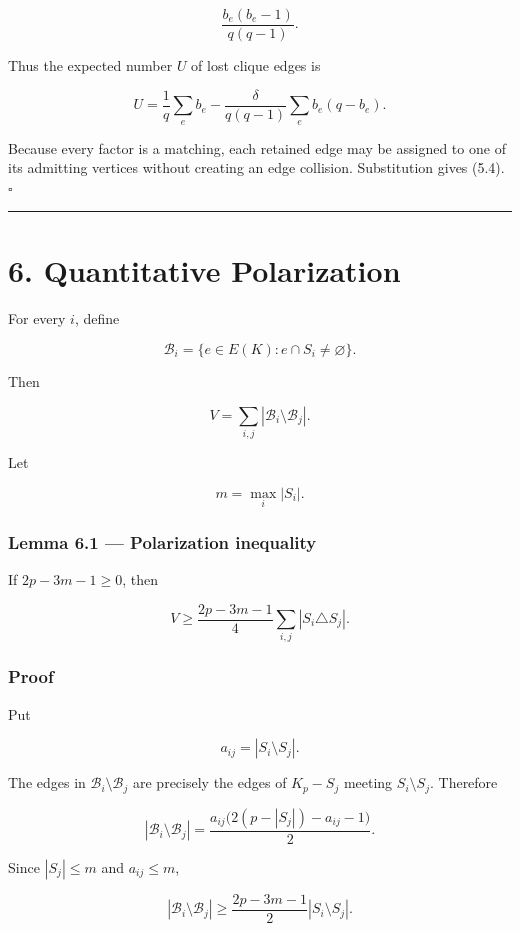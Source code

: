\documentclass[
  11pt,
]{article}
\begin{document}
\[
\frac{b_e(b_e-1)}{q(q-1)}.
\]

Thus the expected number \(U\) of lost clique edges is

\[
U
=
\frac1q\sum_e b_e
-
\frac{\delta}{q(q-1)}\sum_e b_e(q-b_e).
\]

Because every factor is a matching, each retained edge may be assigned
to one of its admitting vertices without creating an edge collision.
Substitution gives (5.4). \(\square\)

\begin{center}\rule{0.5\linewidth}{0.5pt}\end{center}

\section{6. Quantitative Polarization}\label{quantitative-polarization}

For every \(i\), define

\[
\mathcal B_i=\{e\in E(K):e\cap S_i\ne\varnothing\}.
\]

Then

\[
V=\sum_{i,j}|\mathcal B_i\setminus\mathcal B_j|.
\tag{6.1}
\]

Let

\[
m=\max_i|S_i|.
\]

\subsubsection{Lemma 6.1 --- Polarization
inequality}\label{lemma-6.1-polarization-inequality}

If \(2p-3m-1\ge0\), then

\[
\boxed{
V
\ge
\frac{2p-3m-1}{4}
\sum_{i,j}|S_i\triangle S_j|.
}
\tag{6.2}
\]

\subsubsection{Proof}\label{proof-5}

Put

\[
a_{ij}=|S_i\setminus S_j|.
\]

The edges in \(\mathcal B_i\setminus\mathcal B_j\) are precisely the
edges of \(K_p-S_j\) meeting \(S_i\setminus S_j\). Therefore

\[
|\mathcal B_i\setminus\mathcal B_j|
=
\frac{a_{ij}\bigl(2(p-|S_j|)-a_{ij}-1\bigr)}2.
\]

Since \(|S_j|\le m\) and \(a_{ij}\le m\),

\[
|\mathcal B_i\setminus\mathcal B_j|
\ge
\frac{2p-3m-1}{2}|S_i\setminus S_j|.
\]
\end{document}
